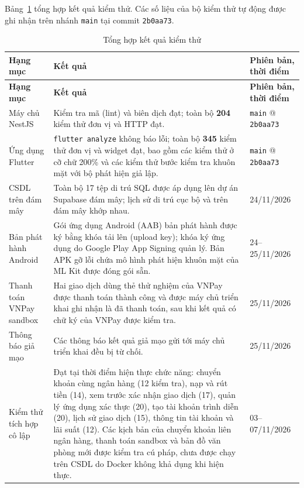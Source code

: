 Bảng~\ref{tab:ch5-ket-qua} tổng hợp kết quả kiểm thử. Các số liệu của bộ kiểm thử tự động được ghi nhận trên nhánh \texttt{main} tại commit \texttt{2b0aa73}.

\begingroup
\linespread{1.15}\small
\begin{longtable}{@{}p{3.6cm} p{8.2cm} p{2.8cm}@{}}
	\caption{Tổng hợp kết quả kiểm thử}
	\label{tab:ch5-ket-qua} \\
	\toprule
	\textbf{Hạng mục} & \textbf{Kết quả} & \textbf{Phiên bản, thời điểm} \\
	\midrule
	\endfirsthead
	\toprule
	\textbf{Hạng mục} & \textbf{Kết quả} & \textbf{Phiên bản, thời điểm} \\
	\midrule
	\endhead
	\bottomrule
	\endfoot
	Máy chủ NestJS & Kiểm tra mã (lint) và biên dịch đạt; toàn bộ \textbf{204} kiểm thử đơn vị và HTTP đạt. & \texttt{main} @ \texttt{2b0aa73} \\
	\midrule
	Ứng dụng Flutter & \texttt{flutter analyze} không báo lỗi; toàn bộ \textbf{345} kiểm thử đơn vị và widget đạt, bao gồm các kiểm thử ở cỡ chữ 200\% và các kiểm thử bước kiểm tra khuôn mặt với bộ phát hiện giả lập. & \texttt{main} @ \texttt{2b0aa73} \\
	\midrule
	CSDL trên đám mây & Toàn bộ 17 tệp di trú SQL được áp dụng lên dự án Supabase đám mây; lịch sử di trú cục bộ và trên đám mây khớp nhau. & 24/11/2026 \\
	\midrule
	Bản phát hành Android & Gói ứng dụng Android (AAB) bản phát hành được ký bằng khóa tải lên (upload key); khóa ký ứng dụng do Google Play App Signing quản lý. Bản APK gỡ lỗi chứa mô hình phát hiện khuôn mặt của ML Kit được đóng gói sẵn. & 24--25/11/2026 \\
	\midrule
	Thanh toán VNPay sandbox & Hai giao dịch dùng thẻ thử nghiệm của VNPay được thanh toán thành công và được máy chủ triển khai ghi nhận là đã thanh toán, sau khi kết quả có chữ ký của VNPay được kiểm tra. & 25/11/2026 \\
	\midrule
	Thông báo giả mạo & Các thông báo kết quả giả mạo gửi tới máy chủ triển khai đều bị từ chối. & 25/11/2026 \\
	\midrule
	Kiểm thử tích hợp cô lập & Đạt tại thời điểm hiện thực chức năng: chuyển khoản cùng ngân hàng (12 kiểm tra), nạp và rút tiền (14), xem trước xác nhận giao dịch (17), quản lý ứng dụng xác thực (20), tạo tài khoản trình diễn (20), lịch sử giao dịch (15), thông tin tài khoản và lãi suất (12). Các kịch bản của chuyển khoản liên ngân hàng, thanh toán sandbox và bản đồ văn phòng mới được kiểm tra cú pháp, chưa được chạy trên CSDL do Docker không khả dụng khi hiện thực. & 03--07/11/2026 \\
\end{longtable}
\endgroup

